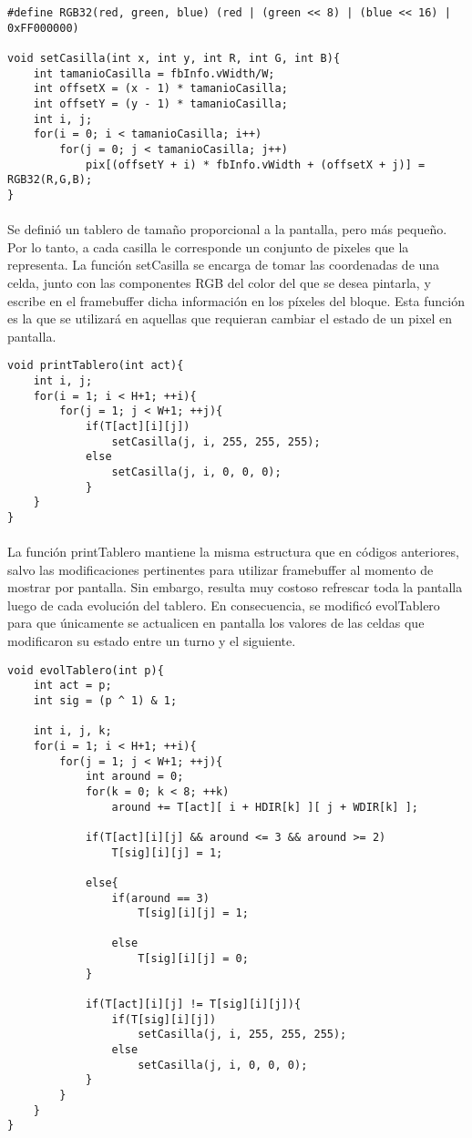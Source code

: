 \documentclass{article}
\begin{document}
\begin{lstlisting}
#define RGB32(red, green, blue) (red | (green << 8) | (blue << 16) | 0xFF000000)

void setCasilla(int x, int y, int R, int G, int B){
	int tamanioCasilla = fbInfo.vWidth/W;
	int offsetX = (x - 1) * tamanioCasilla;
	int offsetY = (y - 1) * tamanioCasilla;
	int i, j;
	for(i = 0; i < tamanioCasilla; i++)
		for(j = 0; j < tamanioCasilla; j++)
			pix[(offsetY + i) * fbInfo.vWidth + (offsetX + j)] = RGB32(R,G,B);
}
\end{lstlisting}

\paragraph{}
Se defini\'o un tablero de tama\~no proporcional a la pantalla, pero m\'as peque\~no. Por lo tanto, a cada casilla le corresponde un conjunto de pixeles que la representa. La funci\'on setCasilla se encarga de tomar las coordenadas de una celda, junto con las componentes RGB del color del que se desea pintarla, y escribe en el framebuffer dicha informaci\'on en los p\'ixeles del bloque. Esta funci\'on es la que se utilizar\'a en aquellas que requieran cambiar el estado de un pixel en pantalla.

\begin{lstlisting}
void printTablero(int act){
	int i, j;
	for(i = 1; i < H+1; ++i){
		for(j = 1; j < W+1; ++j){
			if(T[act][i][j])
				setCasilla(j, i, 255, 255, 255);
			else
				setCasilla(j, i, 0, 0, 0);
			}
	}
}
\end{lstlisting}

\paragraph{}
La funci\'on printTablero mantiene la misma estructura que en c\'odigos anteriores, salvo las modificaciones pertinentes para utilizar framebuffer al momento de mostrar por pantalla. Sin embargo, resulta muy costoso refrescar toda la pantalla luego de cada evoluci\'on del tablero. En consecuencia, se modific\'o evolTablero para que \'unicamente se actualicen en pantalla los valores de las celdas que modificaron su estado entre un turno y el siguiente.

\begin{lstlisting}
void evolTablero(int p){
	int act = p;
	int sig = (p ^ 1) & 1;
	
	int i, j, k;
	for(i = 1; i < H+1; ++i){
		for(j = 1; j < W+1; ++j){
			int around = 0;
			for(k = 0; k < 8; ++k)
				around += T[act][ i + HDIR[k] ][ j + WDIR[k] ];
			
			if(T[act][i][j] && around <= 3 && around >= 2)
				T[sig][i][j] = 1;
			
			else{
				if(around == 3)
					T[sig][i][j] = 1;
				
				else
					T[sig][i][j] = 0;
			}

			if(T[act][i][j] != T[sig][i][j]){
				if(T[sig][i][j])
					setCasilla(j, i, 255, 255, 255);
				else
					setCasilla(j, i, 0, 0, 0);
			}
		}
	}
}
\end{lstlisting}
\end{document}
